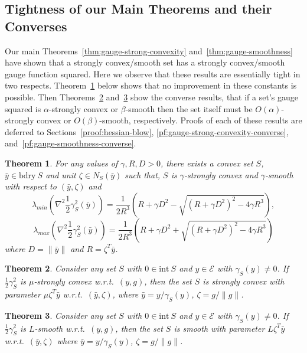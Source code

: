 \documentclass[sn-mathphys,Numbered]{sn-jnl}%
\newcommand{\bdry}{\mathrm{bdry\ }}
\newtheorem{theorem}{Theorem}%
\begin{document}
\subsection{Tightness of our Main Theorems and their Converses}
Our main Theorems~\ref{thm:gauge-strong-convexity} and~\ref{thm:gauge-smoothness} have shown that a strongly convex/smooth set has a strongly convex/smooth gauge function squared. Here we observe that these results are essentially tight in two respects. Theorem~\ref{thm:hessian-blow} below shows that no improvement in these constants is possible. Then Theorems~\ref{thm:gauge-strong-convexity-converse} and~\ref{thm:gauge-smoothness-converse} show the converse results, that if a set's gauge squared is $\alpha$-strongly convex or $\beta$-smooth then the set itself must be $O(\alpha)$-strongly convex or $O(\beta)$-smooth, respectively. Proofs of each of these results are deferred to Sections~\ref{proof:hessian-blow}, \ref{pf:gauge-strong-convexity-converse}, and~\ref{pf:gauge-smoothness-converse}.

\begin{theorem}\label{thm:hessian-blow}
    For any values of $\gamma,R, D>0$, there exists a convex set $S$, $\bar y\in \bdry S$ and unit $\zeta\in N_{S}(\bar y)$ such that, $S$ is $\gamma$-strongly convex and $\gamma$-smooth with respect to $(\bar y,\zeta)$ and
    $$\lambda_{min}(\nabla^2 \frac{1}{2}\gamma^2_S(\bar y)) =\frac{1}{2R^3}\left(R+\gamma D^2-\sqrt{(R+\gamma D^2)^2-4\gamma R^3}\right) , 
    $$
    $$\lambda_{max}(\nabla^2 \frac{1}{2}\gamma^2_S(\bar y)) =\frac{1}{2R^3}\left(R+\gamma D^2+\sqrt{(R+\gamma D^2)^2-4\gamma R^3}\right)
    $$
    where $D=\|\bar y\|$ and $R= \zeta ^T \bar y$.
\end{theorem}
\begin{theorem} \label{thm:gauge-strong-convexity-converse}
    Consider any set $S$ with $0\in \mathrm{int\ } S$ and $y\in\mathcal{E}$ with $\gamma_S(y)\neq 0$. If $\frac{1}{2}\gamma_S^2$ is $\mu$-strongly convex w.r.t.~$(y, g)$, then the set $S$ is strongly convex with parameter $\mu \zeta^T\bar y$ w.r.t.~$(\bar y,\zeta)$, where $\bar y = y/\gamma_S(y)$, $\zeta = g/\|g\|$.
\end{theorem}
\begin{theorem}\label{thm:gauge-smoothness-converse}
    Consider any set $S$ with $0\in \mathrm{int\ } S$ and $y\in\mathcal{E}$ with $\gamma_S(y)\neq 0$. If $\frac{1}{2}\gamma_S^2$ is $L$-smooth w.r.t.~$(y, g)$, then the set $S$ is smooth with parameter $L\zeta^T\bar y$
    w.r.t.~$(\bar y,\zeta)$ where $\bar y = y/\gamma_S(y)$, $\zeta=g/\|g\|$.
\end{theorem}
\end{document}
